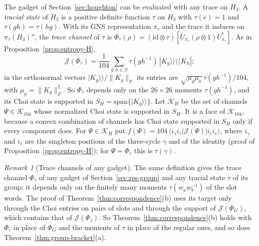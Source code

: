\documentclass[11pt,a4paper]{article}
\theoremstyle{plain}
\theoremstyle{definition}
\theoremstyle{remark}
\newtheorem{remark}[theorem]{Remark}
\begin{document}
The gadget of Section~\ref{sec:houghton} can be evaluated with any trace on $H_3$. A \emph{tracial state} of $H_3$ is a positive definite
function $\tau$ on $H_3$ with $\tau(e)=1$ and $\tau(gh)=\tau(hg)$. With its GNS representation $\pi_\tau$ and the trace it induces on
$\pi_\tau(H_3)''$, the \emph{trace channel} of $\tau$ is $\Phi_\tau(\rho)=(\mathrm{id}\otimes\tau)[U_{\pi_\tau}(\rho\otimes1)U_{\pi_\tau}^*]$. As in
Proposition~\ref{prop:entropy-H},
\begin{equation}\label{eq:trace-choi}
\mathcal J(\Phi_\tau)=\frac1{104}\sum_{g,h\in\mathcal G}\tau(gh^{-1})\,|K_g\rangle\!\rangle\langle\!\langle K_h| ;
\end{equation}
in the orthonormal vectors $|K_g\rangle\!\rangle/\|K_g\|_F$ its entries are $\sqrt{\mu_g\mu_h}\,\tau(gh^{-1})/104$, with $\mu_g=\|K_g\|_F^2$. So $\Phi_\tau$
depends only on the $26\times26$ moments $\tau(gh^{-1})$, and its Choi state is supported in $S_H=\mathrm{span}\{|K_g\rangle\!\rangle\}$. Let
$\mathcal K_H$ be the set of channels $\Psi\in\mathcal K_{104}$ whose normalized Choi state is supported in $S_H$. It is a face of
$\mathcal K_{104}$, because a convex combination of channels has Choi state supported in $S_H$ only if every component does. For
$\Psi\in\mathcal K_H$ put $f(\Psi)=104\,\langle i_\gamma i_\gamma|\mathcal J(\Psi)|i_ei_e\rangle$, where $i_\gamma$ and $i_e$ are the singleton positions of the
three-cycle $\gamma$ and of the identity (proof of Proposition~\ref{prop:entropy-H}); for $\Psi=\Phi_\tau$ this is $\tau(\gamma)$.

\begin{remark}[Trace channels of any gadget]\label{rem:trace-channels}
The same definition gives the trace channel $\Phi_\tau$ of any gadget of Section~\ref{sec:res-group} and any tracial state $\tau$ of its group; it
depends only on the finitely many moments $\tau(w_aw_b^{-1})$ of the slot words. The proof of Theorem~\ref{thm:correspondence}(b) uses its target
only through the Choi entries on pairs of slots and through the support of $\mathcal J(\Phi_G)$, which contains that of $\mathcal J(\Phi_\tau)$.
So Theorem~\ref{thm:correspondence}(b) holds with $\Phi_\tau$ in place of $\Phi_G$ and the moments of $\tau$ in place of the regular ones, and so
does Theorem~\ref{thm:group-bracket}(a).
\end{remark}
\end{document}
